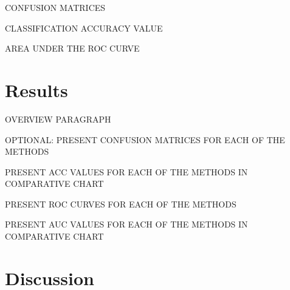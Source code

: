\documentclass[12pt]{article}
\begin{document}
CONFUSION MATRICES

CLASSIFICATION ACCURACY VALUE

AREA UNDER THE ROC CURVE

\section{Results}
\label{sec:resu}

OVERVIEW PARAGRAPH

OPTIONAL: PRESENT CONFUSION MATRICES FOR EACH OF THE METHODS

PRESENT ACC VALUES FOR EACH OF THE METHODS IN COMPARATIVE CHART

PRESENT ROC CURVES FOR EACH OF THE METHODS

PRESENT AUC VALUES FOR EACH OF THE METHODS IN COMPARATIVE CHART

\section{Discussion}
\label{sec:disc}







\end{document}
